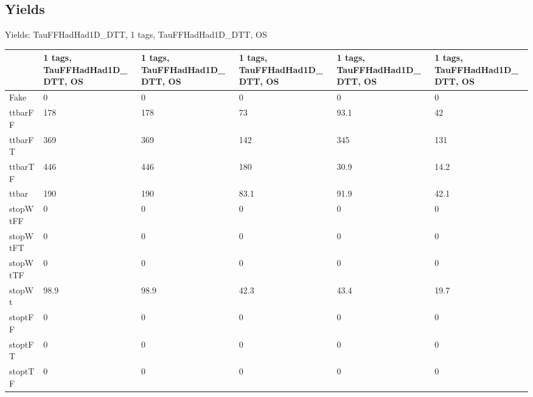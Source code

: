 
\subsection{Yields}

\begin{frame}{Yields: TauFFHadHad1D\_DTT, 1 tags, TauFFHadHad1D\_DTT, OS}
\begin{center}
  \begin{tabular}{l| >{\centering\let\newline\\\arraybackslash\hspace{0pt}}m{1.4cm}| >{\centering\let\newline\\\arraybackslash\hspace{0pt}}m{1.4cm}| >{\centering\let\newline\\\arraybackslash\hspace{0pt}}m{1.4cm}| >{\centering\let\newline\\\arraybackslash\hspace{0pt}}m{1.4cm}| >{\centering\let\newline\\\arraybackslash\hspace{0pt}}m{1.4cm}}
    & 1 tags, TauFFHadHad1D\_DTT, OS & 1 tags, TauFFHadHad1D\_DTT, OS & 1 tags, TauFFHadHad1D\_DTT, OS & 1 tags, TauFFHadHad1D\_DTT, OS & 1 tags, TauFFHadHad1D\_DTT, OS \\
 \hline \hline
    Fake& 0 & 0 & 0 & 0 & 0 \\
 \hline
    ttbarFF& 178 & 178 & 73 & 93.1 & 42 \\
 \hline
    ttbarFT& 369 & 369 & 142 & 345 & 131 \\
 \hline
    ttbarTF& 446 & 446 & 180 & 30.9 & 14.2 \\
 \hline
    ttbar& 190 & 190 & 83.1 & 91.9 & 42.1 \\
 \hline
    stopWtFF& 0 & 0 & 0 & 0 & 0 \\
 \hline
    stopWtFT& 0 & 0 & 0 & 0 & 0 \\
 \hline
    stopWtTF& 0 & 0 & 0 & 0 & 0 \\
 \hline
    stopWt& 98.9 & 98.9 & 42.3 & 43.4 & 19.7 \\
 \hline
    stoptFF& 0 & 0 & 0 & 0 & 0 \\
 \hline
    stoptFT& 0 & 0 & 0 & 0 & 0 \\
 \hline
    stoptTF& 0 & 0 & 0 & 0 & 0 \\

\end{tabular}
\end{center}
\end{frame}
